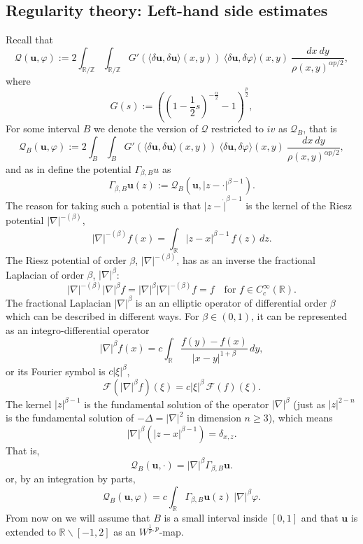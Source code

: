 \documentclass[a4paper,10pt,intlimits,ngerman]{amsart}
\newcommand{\iv}{B} %
\numberwithin{equation}{section}
\newcommand{\R}{\mathbb{R}}
\newcommand{\Z}{\mathbb{Z}}
\newcommand{\solu}{{\boldsymbol{u}}}
\newcommand{\laps}[1]{|\nabla|^{#1}}
\newcommand{\lapms}[1]{|\nabla|^{-\brac{#1}}}
\newcommand{\brac}[1]{\left ( #1 \right )}
\newcommand{\dmv}[2]{\langle \delta #1, \delta #2\rangle}
\begin{document}
\subsection{Regularity theory: Left-hand side estimates}
Recall that
\[
 \mathcal{Q}(\solu,\varphi) := 2\int_{\R/\Z}\int_{\R/\Z} G'(\dmv{\solu}{\solu}(x,y))\ \dmv{\solu}{\varphi}(x,y)\ \frac{dx\ dy}{\rho(x,y)^{\alpha p /2}},
\]
where
\[
 G(s) := \brac{\brac{1- \frac{1}{2} s}^{-\frac{\alpha}{2}}  -1}^{\frac{p}{2}},
\]
For some interval $\iv$ we denote the version of $\mathcal{Q}$ restricted to $iv$ as $\mathcal{Q}_\iv$, that is
\[
 \mathcal{Q}_\iv(\solu,\varphi) := 2\int_{\iv} \int_{\iv} G'(\dmv{\solu}{\solu}(x,y))\ \dmv{\solu}{\varphi}(x,y)\ \frac{dx\ dy}{\rho(x,y)^{\alpha p /2}},
\]
and as in \cite{SchikorraCPDE14} define the potential $\Gamma_{\beta,\iv}u$ as 
\begin{equation}\label{eq:defGammabetaS}
 \Gamma_{\beta,\iv}\solu(z) := \mathcal{Q}_{\iv}(\solu,|z-\cdot|^{\beta-1}).
\end{equation}
The reason for taking such a potential is that $|z-\dot|^{\beta-1}$ is the kernel of the Riesz potential $\lapms{\beta}$,
\[
 \lapms{\beta} f(x) = \int_{\R} |z-x|^{\beta-1}\, f(z)\, dz.
\]
The Riesz potential of order $\beta$, $\lapms{\beta}$, has as an inverse the fractional Laplacian of order $\beta$, $\laps{\beta}$:
\[
 \lapms{\beta} \laps{\beta} f  = \laps{\beta} \lapms{\beta} f = f \quad \mbox{for $f \in C_c^\infty(\R)$}.
\]
The fractional Laplacian $\laps{\beta}$ is an an elliptic operator of differential order $\beta$ which can be described in different ways. For $\beta \in (0,1)$, it can be represented as an integro-differential operator
\[
 \laps{\beta} f(x) = c \int_{\R} \frac{f(y)-f(x)}{|x-y|^{1+\beta}}\, dy,
\]
or its Fourier symbol is $c |\xi|^\beta$,
\[
 \mathcal{F}\brac{\laps{\beta} f}(\xi)=c |\xi|^\beta\, \mathcal{F}(f)(\xi).
\]
The kernel $|z|^{\beta-1}$ is the fundamental solution of the operator $\laps{\beta}$ (just as $|z|^{2-n}$ is the fundamental solution of $-\Delta = \laps{2}$ in dimension $n\geq 3$), which means
\[
 \laps{\beta} \brac{|z-x|^{\beta-1}} = \delta_{x,z}.
\]
That is,
\[
 \mathcal{Q}_\iv(\solu,\cdot) = \laps{\beta} \Gamma_{\beta,\iv}\solu.
\]
or, by an integration by parts,
\[
 \mathcal{Q}_\iv(\solu,\varphi) = c\int_{\R} \Gamma_{\beta,\iv}\solu(z)\ \laps{\beta} \varphi.
\]
From now on we will assume that $\iv$ is a small interval inside $[0,1]$ and that $\solu$ is extended to $\R \backslash [-1,2]$ as an $W^{\frac{1}{p},p}$-map.
\end{document}
